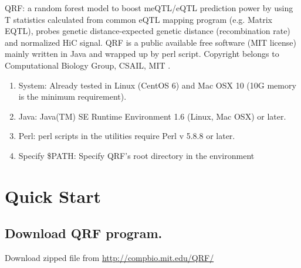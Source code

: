 \documentclass[12pt]{article}
\author{Yaping Liu}
\date{Jul. 15. 2015} %
\begin{document}
\maketitle
\tableofcontents



{}
QRF: a random forest model to boost meQTL/eQTL prediction power by using T statistics calculated from common eQTL mapping program (e.g. Matrix EQTL), probes genetic distance-expected genetic distance (recombination rate) and normalized HiC signal. QRF is a public available free software (MIT license) mainly written in Java and wrapped up by perl script. Copyright belongs to Computational Biology Group, CSAIL, MIT .

{}
\begin{enumerate}
\item System: Already tested in Linux (CentOS 6) and Mac OSX 10 (10G memory is the minimum requirement). 
\item Java: Java(TM) SE Runtime Environment 1.6 (Linux, Mac OSX) or later.
\item Perl: perl scripts in the utilities require Perl v 5.8.8 or later.
\item Specify \$PATH: Specify QRF's root directory in the environment

\end{enumerate}

{\color{red}\section{Quick Start}}

{\color{blue}\subsection{Download QRF program.}}
Download zipped file from \url{http://compbio.mit.edu/QRF/}
\end{document}
